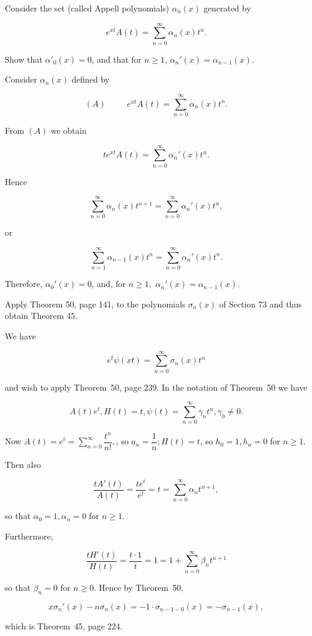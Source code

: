 \begin{problem}\label{problem2chapter8}
Consider the set (called Appell polynomials) $\alpha_n(x)$ generated by

$$e^{xt} A(t) = \displaystyle\sum_{n=0}^{\infty} \alpha_n(x) t^n.$$

Show that $\alpha'_0(x) = 0$, and that for $n \geq 1$, $\alpha_n'(x) = \alpha_{n-1}(x).$
\end{problem}
\begin{solution}
Consider $\alpha_n(x)$ defined by

$$(A) \hspace{30pt} e^{xt}A(t) = \displaystyle\sum_{n=0}^{\infty} \alpha_n(x) t^n.$$

From $(A)$ we obtain

$$t e^{xt} A(t) = \displaystyle\sum_{n=0}^{\infty} \alpha_n'(x) t^n.$$

Hence

$$\displaystyle\sum_{n=0}^{\infty} \alpha_n(x) t^{n+1} = \displaystyle\sum_{n=0}^{\infty} \alpha_n'(x) t^n,$$

or

$$\displaystyle\sum_{n=1}^{\infty} \alpha_{n-1}(x)t^n = \displaystyle\sum_{n=0}^{\infty} \alpha_n'(x) t^n.$$

Therefore, $\alpha_0'(x) =0$, and, for $n \geq 1,$ $\alpha_n'(x) = \alpha_{n-1}(x).$
\end{solution}
\begin{problem}\label{problem3chapter8}
Apply Theorem 50, page 141, to the polynomials $\sigma_n(x)$ of Section 73 and thus obtain Theorem 45.
\end{problem}
\begin{solution}
We have

$$e^t \psi(xt) = \displaystyle\sum_{n=0}^{\infty} \sigma_n(x) t^n$$

and wish to apply Theorem~50, page 239. In the notation of Theorem~50 we have

$$A(t)e^t, H(t)=t, \psi(t) = \displaystyle\sum_{n=0}^{\infty} \gamma_n t^n, \gamma_0 \neq 0.$$

Now $A(t) = e^t = \displaystyle\sum_{n=0}^{\infty} \dfrac{t^n}{n!},$, so $a_n = \dfrac{1}{n}; H(t) = t$, so $h_0=1, h_n=0$ for $n \geq 1.$

Then also

$$\dfrac{t A'(t)}{A(t)} = \dfrac{te^t}{e^t} = t = \displaystyle\sum_{n=0}^{\infty} \alpha_n t^{n+1},$$

so that $\alpha_0=1, \alpha_n=0$ for $n \geq 1$. 

Furthermore,

$$\dfrac{t H'(t)}{H(t)} = \dfrac{t \cdot 1}{t} = 1 = 1 + \displaystyle\sum_{n=0}^{\infty} \beta_n t^{n+1}$$

so that $\beta_n=0$ for $n \geq 0$. Hence by Theorem~50,

$$x \sigma_n'(x) - n \sigma_n(x) = -1 \cdot \sigma_{n-1-0}(x) = -\sigma_{n-1}(x),$$

which is Theorem~45, page 224.
\end{solution}

